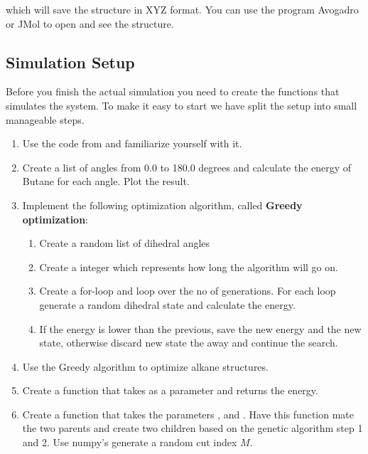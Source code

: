 \documentclass{article}
\begin{document}
which will save the structure in XYZ format.
You can use the program Avogadro or JMol to open and see the structure.

\newpage

\subsection{Simulation Setup}

Before you finish the actual simulation you need to create the functions that simulates the system.
To make it easy to start we have split the setup into small manageable steps.

\begin{enumerate}
    \item Use the code from  and familiarize yourself with it.

    \item Create a list of angles from 0.0 to 180.0 degrees and calculate the energy of Butane for each angle.
    Plot the result.

    \item Implement the following optimization algorithm, called \textbf{Greedy optimization}:
        \begin{enumerate}
            \item Create a random list of dihedral angles
            \item Create a integer  which represents how long the algorithm will go on.
            \item Create a for-loop and loop over the no of generations. 
            For each loop generate a random dihedral state and calculate the energy.
            \item If the energy is lower than the previous, save the new energy and the new state, otherwise discard new state the away and continue the search.
        \end{enumerate}

    \item Use the Greedy algorithm to optimize alkane structures.

    \item Create a function that takes  as a parameter and returns the energy.

    \item Create a function that takes the parameters
    ,
     and
    .
    Have this function mate the two parents and create two children based on the genetic algorithm step 1 and 2.
    Use numpy's  generate a random cut index $M$.


\end{enumerate}
\end{document}
